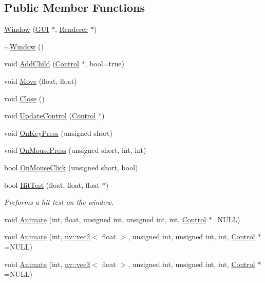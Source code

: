 \subsection*{Public Member Functions}
\begin{CompactItemize}
\item 
\hyperlink{class_window_1202de5bdfb720f5d65e9faefa402da3}{Window} (\hyperlink{class_g_u_i}{GUI} $\ast$, \hyperlink{class_renderer}{Renderer} $\ast$)
\item 
\hyperlink{class_window_245d821e6016fa1f6970ccbbedd635f6}{$\sim$Window} ()
\item 
void \hyperlink{class_window_9aad0f28578feb9939ba854c798cfee3}{AddChild} (\hyperlink{class_control}{Control} $\ast$, bool=true)
\item 
void \hyperlink{class_window_88ad9940f1705d2f635bdefc70384d17}{Move} (float, float)
\item 
void \hyperlink{class_window_4ef67808752d9e9b618859e698f31362}{Close} ()
\item 
void \hyperlink{class_window_ca9b1f11fc660fe7a36e89daa1886560}{UpdateControl} (\hyperlink{class_control}{Control} $\ast$)
\item 
void \hyperlink{class_window_f6f46c0dd9ed75cc8639ca61f8773862}{OnKeyPress} (unsigned short)
\item 
void \hyperlink{class_window_dcf06ec1829e73c79c0c3e4703463a03}{OnMousePress} (unsigned short, int, int)
\item 
bool \hyperlink{class_window_0372a8a9db26dd21a60d4bd71a2547b5}{OnMouseClick} (unsigned short, bool)
\item 
bool \hyperlink{class_window_9d206d4b21db45616135e21e3b2f7b64}{HitTest} (float, float, float $\ast$)
\begin{CompactList}\small\item\em Preforms a hit test on the window. \item\end{CompactList}\item 
void \hyperlink{class_window_c5e3058acce30e972c25bdb9415a6657}{Animate} (int, float, unsigned int, unsigned int, int, \hyperlink{class_control}{Control} $\ast$=NULL)
\item 
void \hyperlink{class_window_4515157e006e39984863e1a78e691275}{Animate} (int, \hyperlink{classnv_1_1vec2}{nv::vec2}$<$ float $>$, unsigned int, unsigned int, int, \hyperlink{class_control}{Control} $\ast$=NULL)
\item 
void \hyperlink{class_window_80c7299c30b007e41e149ca707b14ebe}{Animate} (int, \hyperlink{classnv_1_1vec3}{nv::vec3}$<$ float $>$, unsigned int, unsigned int, int, \hyperlink{class_control}{Control} $\ast$=NULL)

\end{CompactItemize}

